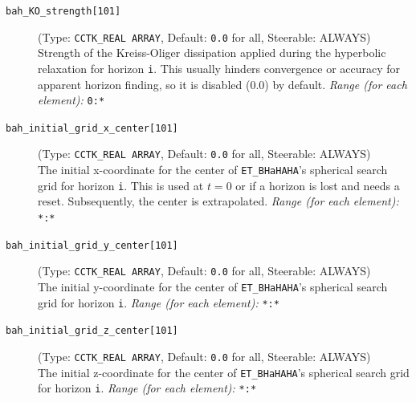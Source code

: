 \documentclass[a4paper,11pt]{article}
\newcommand{\thorn}[1]{{\tt #1}}
\newcommand{\BHaHAHA}{\thorn{ET\_BHaHAHA}} %
\begin{document}
\begin{description}
    \item[\texttt{bah\_KO\_strength[101]}] (Type: \texttt{CCTK\_REAL ARRAY}, Default: \texttt{0.0} for all, Steerable: ALWAYS) \\
        Strength of the Kreiss-Oliger dissipation applied during the hyperbolic relaxation for horizon \texttt{i}. This usually hinders convergence or accuracy for apparent horizon finding, so it is disabled (0.0) by default.
        \textit{Range (for each element):} \texttt{0:*}

    \item[\texttt{bah\_initial\_grid\_x\_center[101]}] (Type: \texttt{CCTK\_REAL ARRAY}, Default: \texttt{0.0} for all, Steerable: ALWAYS) \\
        The initial x-coordinate for the center of \BHaHAHA's spherical search grid for horizon \texttt{i}. This is used at $t=0$ or if a horizon is lost and needs a reset. Subsequently, the center is extrapolated.
        \textit{Range (for each element):} \texttt{*:*}

    \item[\texttt{bah\_initial\_grid\_y\_center[101]}] (Type: \texttt{CCTK\_REAL ARRAY}, Default: \texttt{0.0} for all, Steerable: ALWAYS) \\
        The initial y-coordinate for the center of \BHaHAHA's spherical search grid for horizon \texttt{i}.
        \textit{Range (for each element):} \texttt{*:*}

    \item[\texttt{bah\_initial\_grid\_z\_center[101]}] (Type: \texttt{CCTK\_REAL ARRAY}, Default: \texttt{0.0} for all, Steerable: ALWAYS) \\
        The initial z-coordinate for the center of \BHaHAHA's spherical search grid for horizon \texttt{i}.
        \textit{Range (for each element):} \texttt{*:*}
\end{description}
\end{document}
